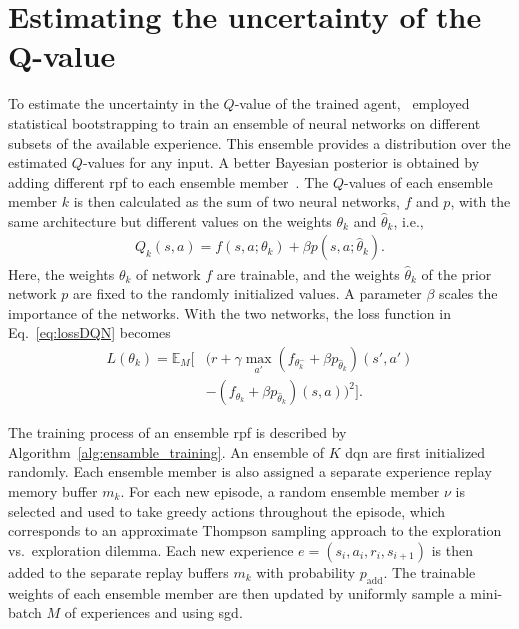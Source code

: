 \section{Estimating the uncertainty of the Q-value}
\label{ch:ensamble}
To estimate the uncertainty in the $Q$-value of the trained agent, \paperEnsamble \ employed statistical bootstrapping to train an ensemble of neural networks on different subsets of the available experience. This ensemble provides a distribution over the estimated $Q$-values for any input. A better Bayesian posterior is obtained by adding different \gls{rpf} to each ensemble member~\cite{Osband2018}.
The $Q$-values of each ensemble member $k$ is then calculated as the sum of two neural networks, $f$ and $p$, with the same architecture but different values on the weights  $\theta_k$ and $\hat{\theta}_k$, i.e.,
%
\begin{align}
	Q_k(s,a) = f(s,a;\theta_k) + \beta p(s,a;\hat{\theta}_k).
\end{align}
Here, the weights $\theta_k$ of network $f$ are trainable, and the weights $\hat{\theta}_k$ of the prior network $p$ are fixed to the randomly initialized values. A parameter $\beta$ scales the importance of the networks. With the two networks, the loss function in Eq.~\ref{eq:lossDQN} becomes
%
\begin{align}
	\label{eq:thesis_loss_boot}
	L(\theta_k) = \mathbb{E}_M \Big[ & (r + \gamma \max_{a'} (f_{\theta^-_k}+\beta p_{\hat{\theta}_k})(s',a') \nonumber \\
	& - (f_{\theta_k}+ \beta p_{\hat{\theta}_k})(s,a) )^2 \Big].
\end{align} 

%

The training process of an ensemble \gls{rpf} is described by Algorithm~\ref{alg:ensamble_training}. 
An ensemble of $K$ \gls{dqn} are first initialized randomly. Each ensemble member is also assigned a separate experience replay memory buffer $m_k$. 
For each new episode, a random ensemble member $\nu$ is selected and used to take greedy actions throughout the episode, which corresponds to an approximate Thompson sampling approach to the exploration vs.~exploration dilemma.
Each new experience $e = (s_i, a_i, r_i, s_{i+1})$ is then added to the separate replay buffers $m_k$ with probability $p_\mathrm{add}$. The trainable weights of each ensemble member are then updated by uniformly sample a mini-batch $M$ of experiences and using \gls{sgd}.

